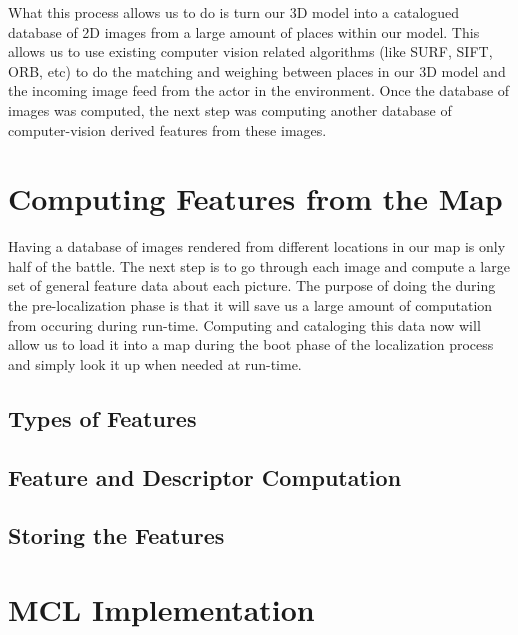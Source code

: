 \documentclass[a4paper,11pt]{article}
\begin{document}
  What this process allows us to do is turn our 3D model into a catalogued database of 2D images from a large amount of places within our model. This allows us to use existing computer vision related algorithms (like SURF, SIFT, ORB, etc) to do the matching and weighing between places in our 3D model and the incoming image feed from the actor in the environment. 
  Once the database of images was computed, the next step was computing another database of computer-vision derived features from these images.




  \section{Computing Features from the Map}
  Having a database of images rendered from different locations in our map is only half of the battle. The next step is to go through each image and compute a large set of general feature data about each picture. The purpose of doing the during the pre-localization phase is that it will save us a large amount of computation from occuring during run-time. Computing and cataloging this data now will allow us to load it into a map during the boot phase of the localization process and simply look it up when needed at run-time.

  \subsection{Types of Features}

  \subsection{Feature and Descriptor Computation}
  
  \subsection{Storing the Features}









  \section{MCL Implementation}
   
  








  
\end{document}
